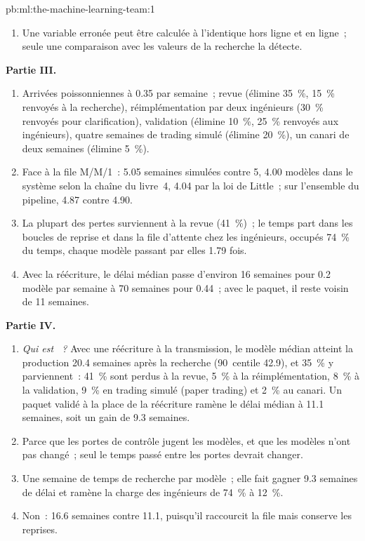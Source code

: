\begin{solution}{pb:ml:the-machine-learning-team:1}
\begin{enumerate}[resume]
\item Une variable erronée peut être calculée à l'identique hors ligne et en ligne~; seule une comparaison avec les valeurs de la recherche la détecte.
\end{enumerate}
\textbf{Partie III.}
\begin{enumerate}[resume]
\item Arrivées poissonniennes à 0.35 par semaine~; revue (élimine 35~\%, 15~\% renvoyés à la recherche), réimplémentation par deux ingénieurs (30~\% renvoyés
pour clarification), validation (élimine 10~\%, 25~\% renvoyés aux ingénieurs), quatre semaines de trading simulé (élimine 20~\%), un
canari de deux semaines (élimine 5~\%).
\item Face à la file M/M/1~: 5.05 semaines simulées contre 5, 4.00 modèles dans le système selon la chaîne du livre~4, 4.04 par la loi de Little~;
sur l'ensemble du pipeline, 4.87 contre 4.90.
\item La plupart des pertes surviennent à la revue (41~\%)~; le temps part dans les boucles de reprise et dans la file d'attente chez les ingénieurs, occupés 74~\% du temps, chaque modèle
passant par elles 1.79 fois.
\item Avec la réécriture, le délai médian passe d'environ 16 semaines pour 0.2 modèle par semaine à 70 semaines pour 0.44~; avec le paquet, il reste voisin de 11 semaines.
\end{enumerate}
\textbf{Partie IV.}
\begin{enumerate}[resume]
\item \emph{Qui est ~?} Avec une réécriture à la transmission, le modèle médian atteint la production 20.4 semaines après la recherche
(90~centile 42.9), et 35~\% y parviennent~: 41~\% sont perdus à la revue, 5~\% à la réimplémentation, 8~\% à la validation, 9~\% en
trading simulé (paper trading) et 2~\% au canari. Un paquet validé à la place de la réécriture ramène le délai médian à 11.1 semaines, soit un gain de 9.3 semaines.
\item Parce que les portes de contrôle jugent les modèles, et que les modèles n'ont pas changé~; seul le temps passé entre les portes devrait changer.
\item Une semaine de temps de recherche par modèle~; elle fait gagner 9.3 semaines de délai et ramène la charge des ingénieurs de 74~\% à 12~\%.
\item Non~: 16.6 semaines contre 11.1, puisqu'il raccourcit la file mais conserve les reprises.

\end{enumerate}
\end{solution}
